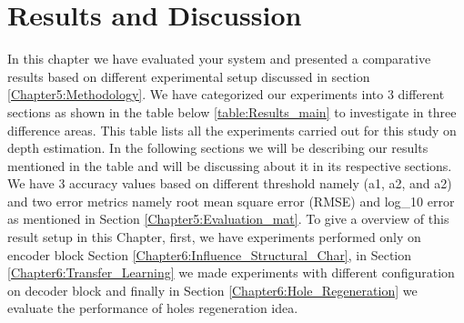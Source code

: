

\chapter{Results and Discussion}

\label{Chapter6:Results}

 
 
In this chapter we have evaluated your system and presented a comparative results  based on different experimental setup discussed in section \ref{Chapter5:Methodology}. We have categorized our experiments into 3 different sections as shown in the table below \ref{table:Results_main} to investigate in three difference areas. This table lists all the experiments carried out for this study on depth estimation. In the following sections we will be describing our results mentioned in the table and will be discussing about it in its respective sections.  We have 3 accuracy values based on different threshold namely (a1, a2, and a2) and two error metrics namely root mean square error (RMSE) and log\_10 error as mentioned in Section \ref{Chapter5:Evaluation_mat}. To give a overview of this result setup in this Chapter, first, we have experiments performed only on encoder block Section \ref{Chapter6:Influence_Structural_Char}, in Section \ref{Chapter6:Transfer_Learning}  we made experiments with different configuration on decoder block and finally in Section \ref{Chapter6:Hole_Regeneration} we evaluate the performance of holes regeneration idea. 

